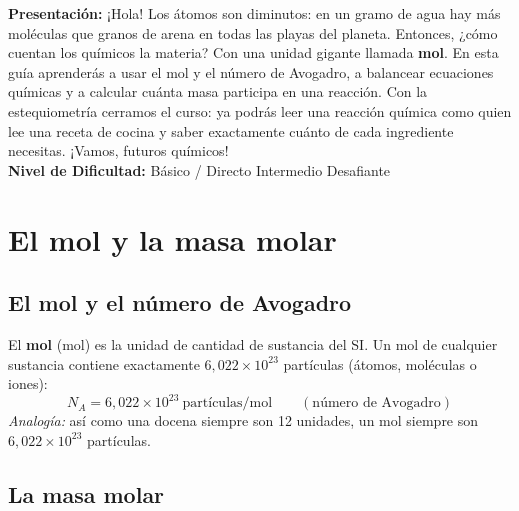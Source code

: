 \documentclass[12pt, letterpaper]{article}
\begin{document}


\vspace{4pt}
\begin{cuadroinfo}
  \small
  \textbf{Presentación:} ¡Hola! Los átomos son diminutos: en un gramo de agua hay más moléculas que granos de arena en todas las playas del planeta. Entonces, ¿cómo cuentan los químicos la materia? Con una unidad gigante llamada \textbf{mol}. En esta guía aprenderás a usar el mol y el número de Avogadro, a balancear ecuaciones químicas y a calcular cuánta masa participa en una reacción. Con la estequiometría cerramos el curso: ya podrás leer una reacción química como quien lee una receta de cocina y saber exactamente cuánto de cada ingrediente necesitas. ¡Vamos, futuros químicos!
  \\[4pt]
  \textbf{Nivel de Dificultad:}\quad
  \facil{} Básico / Directo \quad
  \medio{} Intermedio \quad
  \dificil{} Desafiante
\end{cuadroinfo}

\vspace{8pt}

\section{El mol y la masa molar}

\subsection{El mol y el número de Avogadro}

\begin{cuadroteoria}
  El \textbf{mol} (mol) es la unidad de cantidad de sustancia del SI. Un mol de cualquier sustancia contiene exactamente $6{,}022 \times 10^{23}$ partículas (átomos, moléculas o iones):
  $$N_A = 6{,}022 \times 10^{23} \ \text{partículas/mol} \qquad (\text{número de Avogadro})$$
  \emph{Analogía:} así como una docena siempre son 12 unidades, un mol siempre son $6{,}022 \times 10^{23}$ partículas.
\end{cuadroteoria}

\subsection{La masa molar}
\end{document}
